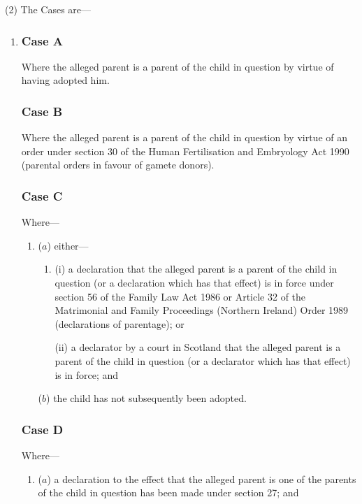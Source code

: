\documentclass[12pt,a4paper]{article}
\begin{document}
(2) The Cases are—
\begin{enumerate}\item[]
    \subsubsection*{Case A}

    Where the alleged parent is a parent of the child in question by virtue of having adopted him.

    \subsubsection*{Case B}

    Where the alleged parent is a parent of the child in question by virtue of an order under section 30 of the Human Fertilisation and Embryology Act 1990 (parental orders in favour of gamete donors).

    \subsubsection*{Case C}

    Where—
\begin{enumerate}\item[]
    ($a$) 
    either—
\begin{enumerate}\item[]
    (i) 
    a declaration that the alleged parent is a parent of the child in question (or a declaration which has that effect) is in force under section 56 of the Family Law Act 1986 
or Article 32 of the Matrimonial and Family Proceedings (Northern Ireland) Order 1989  %
(declarations of parentage); or

    (ii) 
    a declarator by a court in Scotland that the alleged parent is a parent of the child in question (or a declarator which has that effect) is in force; and
\end{enumerate}

    ($b$) 
    the child has not subsequently been adopted.
\end{enumerate}

    \subsubsection*{Case D}

    Where—
\begin{enumerate}\item[]
    ($a$) 
    a declaration to the effect that the alleged parent is one of the parents of the child in question has been made under section 27; and


\end{enumerate}
\end{enumerate}
\end{document}
